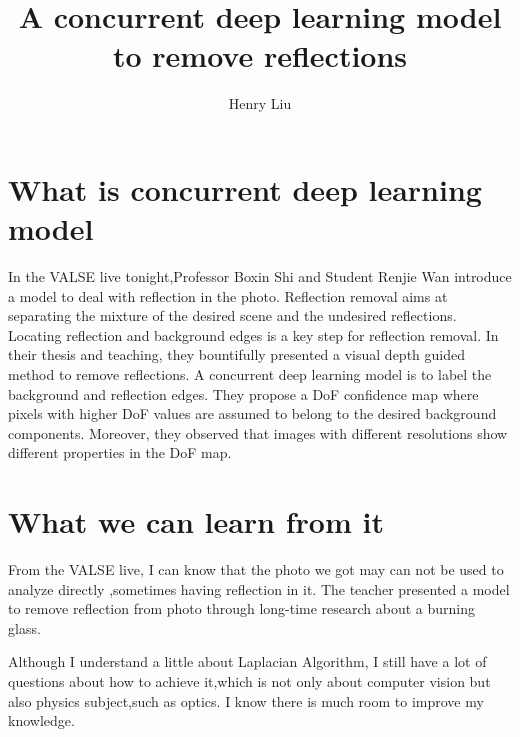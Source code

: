 \documentclass{article}
\author{Henry Liu}
\title{A concurrent deep learning model to remove reflections}
\begin{document}
  \maketitle
  \section{What is concurrent deep learning model}
  \par
  In the VALSE live tonight,Professor Boxin Shi and Student Renjie Wan introduce a model to deal with reflection in the photo.
  Reflection removal aims at separating the mixture of the desired scene and the undesired reflections. 
  Locating reflection and background edges is a key step for reflection removal. 
  In their thesis and teaching, they bountifully presented a visual depth guided method to remove reflections. 
  A concurrent deep learning model is to label the background and reflection edges.
  They propose a DoF confidence map where pixels with higher DoF values are assumed to belong to the desired background components. 
  Moreover, they observed that images with different resolutions show different properties in the DoF map.
  
  \section{What we can learn from it}
  \par
  From the VALSE live, I can know that the photo we got may can not be used to analyze directly ,sometimes having reflection in it.
  The teacher presented a model to remove reflection from photo through long-time research about a burning glass.

  Although I understand a little about Laplacian Algorithm, I still have a lot of questions about how to achieve it,which is not only about computer vision but also physics subject,such as optics.
  I know there is much room to improve my knowledge.
\end{document}
